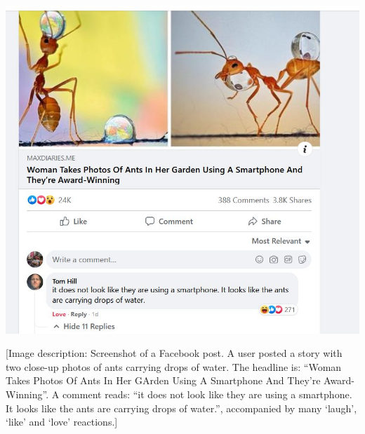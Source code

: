 \documentclass{article}
\begin{document}
\begin{center}
\includegraphics[width=0.6\linewidth, alt={Screenshot of a Facebook post. A user posted a story with two close-up photos of ants carrying drops of water. The headline is: ``Woman Takes Photos Of Ants In Her GArden Using A Smartphone And They're Award-Winning''. A comment reads: ``it does not look like they are using a smartphone. It looks like the ants are carrying drops of water.'', accompanied by many `laugh', `like' and `love' reactions.}]{Images/award-winning-ants.jpg}
\end{center}
[Image description: Screenshot of a Facebook post. A user posted a story with two close-up photos of ants carrying drops of water. The headline is: ``Woman Takes Photos Of Ants In Her GArden Using A Smartphone And They're Award-Winning''. A comment reads: ``it does not look like they are using a smartphone. It looks like the ants are carrying drops of water.'', accompanied by many `laugh', `like' and `love' reactions.]
\end{document}
